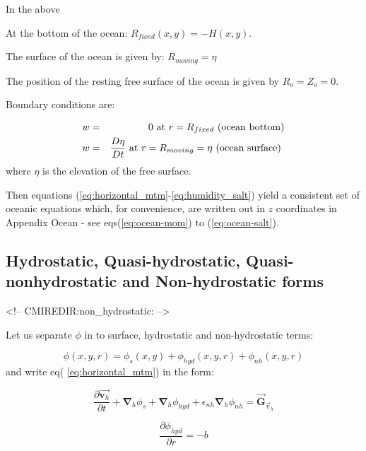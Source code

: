 In the above

At the bottom of the ocean: $R_{fixed}(x,y)=-H(x,y)$.

The surface of the ocean is given by: $R_{moving}=\eta $

The position of the resting free surface of the ocean is given by $
R_{o}=Z_{o}=0$.

Boundary conditions are:

\begin{eqnarray}
w &=&0~\text{at }r=R_{fixed}\text{ (ocean bottom)}  \label{eq:fixed-bc-ocean}
\\
w &=&\frac{D\eta }{Dt}\text{ at }r=R_{moving}=\eta \text{ (ocean surface) 
\label{eq:moving-bc-ocean}}
\end{eqnarray}
where $\eta $ is the elevation of the free surface.

Then equations (\ref{eq:horizontal_mtm}-\ref{eq:humidity_salt}) yield a consistent set 
of oceanic equations
which, for convenience, are written out in $z$ coordinates in Appendix Ocean
- see eqs(\ref{eq:ocean-mom}) to (\ref{eq:ocean-salt}).

\subsection{Hydrostatic, Quasi-hydrostatic, Quasi-nonhydrostatic and
Non-hydrostatic forms}
\begin{rawhtml}
<!-- CMIREDIR:non_hydrostatic: -->
\end{rawhtml}


Let us separate $\phi $ in to surface, hydrostatic and non-hydrostatic terms:

\begin{equation}
\phi (x,y,r)=\phi _{s}(x,y)+\phi _{hyd}(x,y,r)+\phi _{nh}(x,y,r)
\label{eq:phi-split}
\end{equation}
and write eq( \ref{eq:horizontal_mtm}) in the form:

\begin{equation}
\frac{\partial \vec{\mathbf{v}_{h}}}{\partial t}+\mathbf{\nabla }_{h}\phi
_{s}+\mathbf{\nabla }_{h}\phi _{hyd}+\epsilon _{nh}\mathbf{\nabla }_{h}\phi
_{nh}=\vec{\mathbf{G}}_{\vec{v}_{h}}  \label{eq:mom-h}
\end{equation}

\begin{equation}
\frac{\partial \phi _{hyd}}{\partial r}=-b  \label{eq:hydrostatic}
\end{equation}

